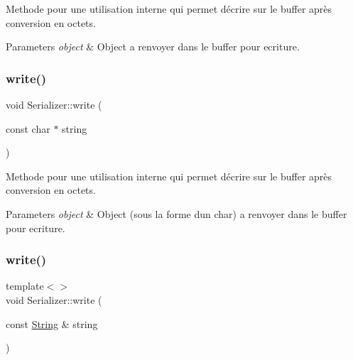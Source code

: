 Methode pour une utilisation interne qui permet d\textquotesingle{}écrire sur le buffer après conversion en octets. 


\begin{DoxyParams}{Parameters}
{\em object} & Object a renvoyer dans le buffer pour ecriture. \\
\hline
\end{DoxyParams}
\mbox{\label{struct_serializer_ac0afd6edf14f126f8c7f95d670d83d0b}} 
\subsubsection{\texorpdfstring{write()}{write()}\hspace{0.1cm}{\footnotesize\ttfamily [2/3]}}
{\footnotesize\ttfamily void Serializer\+::write (\begin{DoxyParamCaption}\item[{const char $\ast$}]{string }\end{DoxyParamCaption})\hspace{0.3cm}{\ttfamily [inline]}}



Methode pour une utilisation interne qui permet d\textquotesingle{}écrire sur le buffer après conversion en octets. 


\begin{DoxyParams}{Parameters}
{\em object} & Object (sous la forme d\textquotesingle{}un char) a renvoyer dans le buffer pour ecriture. \\
\hline
\end{DoxyParams}
\mbox{\label{struct_serializer_a1538c2a1dbc7eca145e370c1a1619d59}} 
\subsubsection{\texorpdfstring{write()}{write()}\hspace{0.1cm}{\footnotesize\ttfamily [3/3]}}
{\footnotesize\ttfamily template$<$$>$ \\
void Serializer\+::write (\begin{DoxyParamCaption}\item[{const \hyperlink{serialutils_8h_afbeda3fd1bdc8c37d01bdf9f5c8274ff}{String} \&}]{string }\end{DoxyParamCaption})\hspace{0.3cm}{\ttfamily [inline]}}



